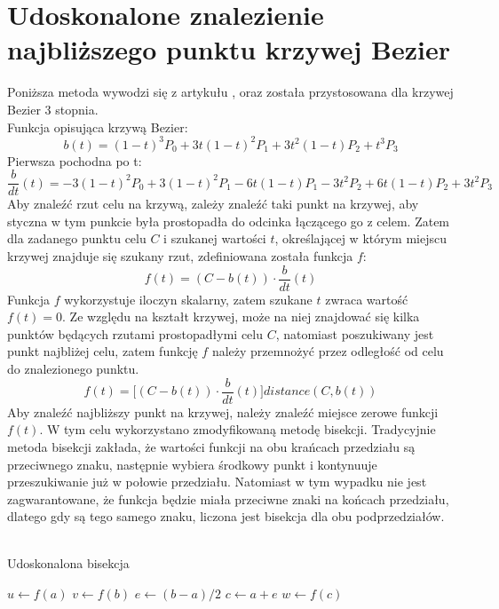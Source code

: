 \section{Udoskonalone znalezienie najbliższego punktu krzywej Bezier}
Poniższa metoda wywodzi się z artykułu \cite{ImprovedPointProjectionBezier}, oraz została przystosowana dla krzywej Bezier 3 stopnia.\\
Funkcja opisująca krzywą Bezier:
\[ b(t) = (1 - t)^3 P_0 + 3t(1-t)^2 P_1 + 3t^2 (1-t) P_2 + t^3 P_3 \]
Pierwsza pochodna po t:
\[ \frac{b}{dt}(t) = -3 (1 - t)^2 P_0 + 3 (1-t)^2 P_1 - 6 t (1-t) P_1 - 3t^2 P_2 + 6 t (1-t) P_2 + 3t^2 P_3 \]
Aby znaleźć rzut celu na krzywą, zależy znaleźć taki punkt na krzywej, aby styczna w tym punkcie była prostopadła do odcinka łączącego go z celem. Zatem dla zadanego punktu celu $C$ i szukanej wartości $t$, określającej w którym miejscu krzywej znajduje się szukany rzut, zdefiniowana została funkcja $f$:
\[ f(t) = (C - b(t)) \cdot \frac{b}{dt}(t) \]
Funkcja $f$ wykorzystuje iloczyn skalarny, zatem szukane $t$ zwraca wartość $f(t) = 0$. Ze względu na kształt krzywej, może na niej znajdować się kilka punktów będących rzutami prostopadłymi celu $C$, natomiast poszukiwany jest punkt najbliżej celu, zatem funkcję $f$ należy przemnożyć przez odległość od celu do znalezionego punktu.
\[ f(t) = \big[ (C - b(t)) \cdot \frac{b}{dt}(t) \big] distance(C, b(t)) \]
Aby znaleźć najbliższy punkt na krzywej, należy znaleźć miejsce zerowe funkcji $f(t)$. W tym celu wykorzystano zmodyfikowaną metodę bisekcji. Tradycyjnie metoda bisekcji zakłada, że wartości funkcji na obu krańcach przedziału są przeciwnego znaku, następnie wybiera środkowy punkt i kontynuuje przeszukiwanie już w połowie przedziału. Natomiast w tym wypadku nie jest zagwarantowane, że funkcja będzie miała przeciwne znaki na końcach przedziału, dlatego gdy są tego samego znaku, liczona jest bisekcja dla obu podprzedziałów.
\\\\
\begin{algorithm}[H]
    \caption{Udoskonalona bisekcja}\label{alg}
    $u \gets f(a)$\;
    $v \gets f(b)$\;
    $e \gets (b-a)/2$\;
    $c \gets a+e$\;
    $w \gets f(c)$\;
\end{algorithm}
\phantom{.}\\

